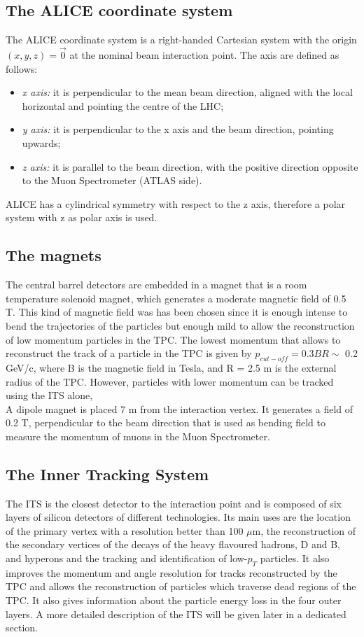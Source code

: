 \subsection{The ALICE coordinate system}
The ALICE coordinate system is a right-handed Cartesian system with the origin $(x,y,z)=\vec{0}$ at the nominal beam interaction point. The axis are defined as follows:
\begin{itemize}
 \item \textit{x axis:} it is perpendicular to the mean beam direction, aligned with the local horizontal and pointing the centre of the LHC;
 \item \textit{y axis:} it is perpendicular to the x axis and the beam direction, pointing upwards;
 \item \textit{z axis:} it is parallel to the beam direction, with the positive direction opposite to the Muon Spectrometer (ATLAS side).
\end{itemize}
ALICE has a cylindrical symmetry with respect to the z axis, therefore a polar system with z as polar axis is used.
\subsection*{The magnets}
The central barrel detectors are embedded in a magnet that is a room temperature solenoid magnet, which generates a moderate magnetic field of 0.5 T. This kind of magnetic field was has been chosen since it is enough intense to bend the trajectories of the particles but enough mild to allow the reconstruction of low momentum particles in the TPC. The lowest momentum that allows to reconstruct the track of a particle in the TPC is given by $p_{cut-off} = 0.3 BR \sim$ 0.2 GeV/c, where B is the magnetic field in Tesla, and R = 2.5 m is the external radius of the TPC. However, particles with lower momentum can be tracked using the ITS alone,\\
A dipole magnet is placed 7 m from the interaction vertex. It generates a field of 0.2 T, perpendicular to the beam direction that is used as bending field to measure the momentum of muons in the Muon Spectrometer.
\subsection*{The Inner Tracking System}
The ITS is the closest detector to the interaction point and is composed of six layers of silicon detectors of different technologies. Its main uses are the location of the primary vertex with a resolution better than 100 $\mu$m, the reconstruction of the secondary vertices of the decays of the heavy flavoured hadrons, D and B, and hyperons and the tracking and identification of low-$p_T$ particles. It also improves the momentum and angle resolution for tracks reconstructed by the TPC and allows the reconstruction of particles which traverse dead regions of the TPC. It also gives information about the particle energy loss in the four outer layers. A more detailed description of the ITS will be given later in a dedicated section.
